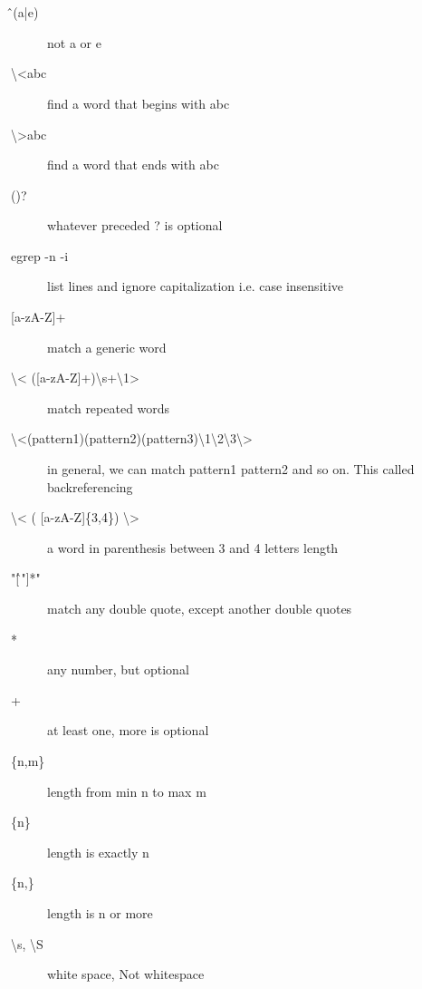 \documentclass[12pt,a4paper]{report}
\begin{document}
\section{\color{Magenta}{Master RegEx}\\}
\begin{description}
\item[\^\,(a|e)] not a or e  \\
\item[\textbackslash<abc] find a word that begins with abc\\
\item[\textbackslash>abc] find a word that ends with abc  \\
\item[()?] whatever preceded ? is optional  \\
\item[egrep -n -i] list lines and ignore capitalization i.e. case insensitive  \\
\item[{[a-zA-Z]+}] match a generic word  \\
\item[{\textbackslash < ([a-zA-Z]+)\textbackslash s+\textbackslash 1>}] match repeated words  \\
\item[\textbackslash <(pattern1)(pattern2)(pattern3)\textbackslash 1\textbackslash 2\textbackslash 3\textbackslash >] in general, we can match pattern1 pattern2 and so on. This called backreferencing  \\
\item[\textbackslash < ( {[a-zA-Z]\{3,4\}}) \textbackslash >] a word in parenthesis between 3 and 4 letters length   \\
\item["{[\^\,"]}*"] match any double quote, except another double quotes  \\
\item[*] any number, but optional  \\
\item[+] at least one, more is optional  \\
\item[\{n,m\}] length from min n to max m  \\
\item[\{n\}] length is exactly n  \\
\item[\{n,\}] length is n or more  \\
\item[\textbackslash s, \textbackslash S] white space, Not whitespace  \\

\end{description}
\end{document}
